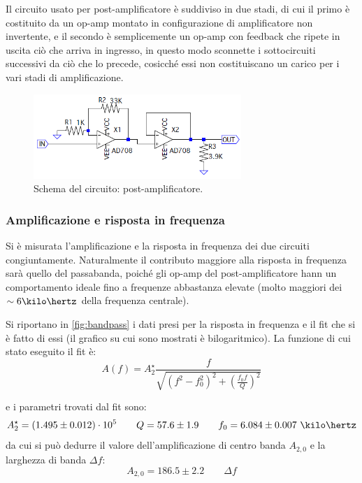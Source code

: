 \documentclass[a4paper,10pt]{article}
\begin{document}
Il circuito usato per post-amplificatore è suddiviso in due stadi, di cui il primo è costituito da un op-amp montato in configurazione di amplificatore non invertente, e il secondo è semplicemente un op-amp con feedback che ripete in uscita ciò che arriva in ingresso, in questo modo sconnette i sottocircuiti successivi da ciò che lo precede, cosicché essi non costituiscano un carico per i vari stadi di amplificazione. 

\begin{figure}[H]
	\vspace{-10pt}
	\centering
	\includegraphics[width=0.7\textwidth]{../grafici/PostAmp.png}
	\vspace{-12pt}
	\caption{Schema del circuito: post-amplificatore.}
	\label{fig:postamp}
	\vspace{-6pt}
\end{figure}

\subsubsection*{Amplificazione e risposta in frequenza}

Si è misurata l'amplificazione e la risposta in frequenza dei due circuiti congiuntamente. Naturalmente il contributo maggiore alla risposta in frequenza sarà quello del passabanda, poiché gli op-amp del post-amplificatore hann un comportamento ideale fino a frequenze abbastanza elevate (molto maggiori dei $\sim 6 \kilo\hertz $ della frequenza centrale).

Si riportano in \cref{fig:bandpass} i dati presi per la risposta in frequenza e il fit che si è fatto di essi (il grafico su cui sono mostrati è bilogaritmico).
La funzione di cui stato eseguito il fit è:
\[ A(f) = A_2^\star \frac{f}{\sqrt{(f^2-f_0^2)^2 + \left(\frac{f_0 f}{Q}\right)^2}} \]

e i parametri trovati dal fit sono:
\[ A_2^\star=(1.495 \pm 0.012)\cdot10^5 \qquad Q=57.6 \pm 1.9 \qquad f_0=6.084 \pm 0.007~\kilo\hertz  \]
da cui si può dedurre il valore dell'amplificazione di centro banda $ A_{2,0} $ e la larghezza di banda $ \Delta f $:
\[ A_{2,0} = 186.5 \pm 2.2	\qquad	\Delta f \]
\end{document}
